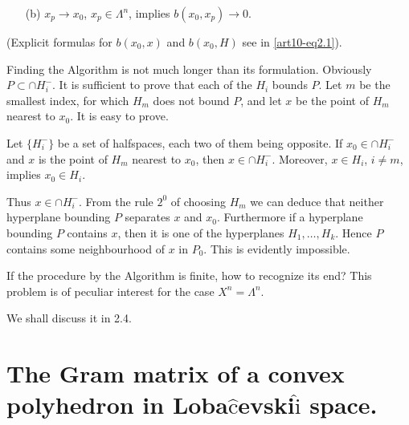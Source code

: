 \begin{enumerate}
\begin{itemize}
\item[(b)] $x_p \to x_0$, $x_p \in \Lambda^n$, implies $b(x_0 , x_p) \to 0$. 
\end{itemize}

(Explicit formulas for $b (x_0, x)$ and $b(x_0, H)$ see in \ref{art10-eq2.1}).

Finding the Algorithm is not much longer than its formulation. Obviously $P\subset \cap H^-_i$. It is sufficient to prove that each of the $H_i$ bounds $P$. Let $m$ be the smallest index, for which $H_m$ does not bound $P$, and let $x$ be the point of $H_m$ nearest to $x_0$. It is easy to prove.
\end{enumerate}

\setcounter{lemma}{3}
\begin{lemma}\label{art10-lem1.4}
Let $\{H^-_i\}$ be a set of halfspaces, each two of them being opposite. If $x_0 \in \cap H^-_i$ and $x$ is the point of $H_m$ nearest to $x_0$, then $x \in \cap H^-_i$. Moreover, $x \in H_i$, $i \neq m$, implies $x_0 \in H_i$.
\end{lemma}

Thus $x \in \cap H^-_i$. From the rule $2^0$ of choosing $H_m$ we can deduce that neither hyperplane bounding $P$ separates $x$ and $x_0$. Furthermore if a hyperplane bounding $P$ contains $x$, then it is one of the hyperplanes $H_1,\ldots, H_k$. Hence $P$ contains some neighbourhood of $x$ in $P_0$. This is evidently impossible.

If the procedure by the Algorithm is finite, how to recognize its end? This problem is of peculiar interest for the case $X^n = \Lambda^n$.

We shall discuss it in 2.4.

\section{The Gram matrix of a convex polyhedron in Loba$\hat{\text{c}}$evski$\hat{\text{i}}$ space.}\label{art10-sec2}

